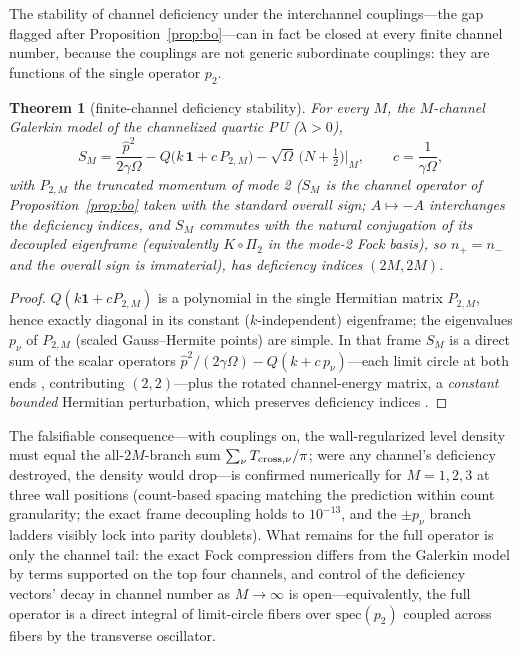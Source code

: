 \documentclass[11pt]{article}
\newtheorem{theorem}{Theorem}[section]
\theoremstyle{definition}
\theoremstyle{remark}
\begin{document}
The stability of channel deficiency under the interchannel couplings---the
gap flagged after Proposition~\ref{prop:bo}---can in fact be closed at
every finite channel number, because the couplings are not generic
subordinate couplings: they are functions of the single operator $p_2$.

\begin{theorem}[finite-channel deficiency stability]
\label{thm:stability}
For every $M$, the $M$-channel Galerkin model of the channelized quartic
PU ($\lambda>0$),
\[
S_M=\frac{\hat p^{2}}{2\gamma\Omega}
-Q\bigl(k\,\mathbf 1+c\,P_{2,M}\bigr)
-\sqrt\Omega\,\bigl(N+\tfrac12\bigr)\Big|_{M},
\qquad c=\frac{1}{\gamma\Omega},
\]
with $P_{2,M}$ the truncated momentum of mode 2 ($S_M$ is the
channel operator of Proposition~\ref{prop:bo} taken with the
standard overall sign; $A\mapsto-A$ interchanges the deficiency
indices, and $S_M$ commutes with the natural conjugation of its decoupled
eigenframe (equivalently $K\circ\Pi_2$ in the mode-2 Fock basis), so
$n_+=n_-$ and the overall sign is immaterial), has deficiency indices
$(2M,2M)$.
\end{theorem}

\begin{proof}
$Q(k\mathbf 1+cP_{2,M})$ is a polynomial in the single Hermitian matrix
$P_{2,M}$, hence exactly diagonal in its constant ($k$-independent)
eigenframe; the eigenvalues $p_\nu$ of $P_{2,M}$ (scaled Gauss--Hermite
points) are simple. In that frame $S_M$ is a direct sum of the scalar
operators $\hat p^{2}/(2\gamma\Omega)-Q(k+c\,p_\nu)$---each limit circle
at both ends \cite{ReedSimon2}, contributing $(2,2)$---plus the rotated
channel-energy matrix, a \emph{constant bounded} Hermitian perturbation,
which preserves deficiency indices \cite{KatoBook}.
\end{proof}

The falsifiable consequence---with couplings on, the wall-regularized
level density must equal the all-$2M$-branch sum
$\sum_{\nu}T_{{\rm cross},\nu}/\pi$; were any channel's deficiency
destroyed, the density would drop---is confirmed numerically for
$M=1,2,3$ at three wall positions (count-based spacing matching the
prediction within count granularity; the exact frame decoupling holds to
$10^{-13}$, and the $\pm p_\nu$ branch ladders visibly lock into parity
doublets). What remains for the full operator is only the channel tail:
the exact Fock compression differs from the Galerkin model by terms
supported on the top four channels, and control of the deficiency
vectors' decay in channel number as $M\to\infty$ is open---equivalently,
the full operator is a direct integral of limit-circle fibers over
$\mathrm{spec}(p_2)$ coupled across fibers by the transverse oscillator.
\end{document}
